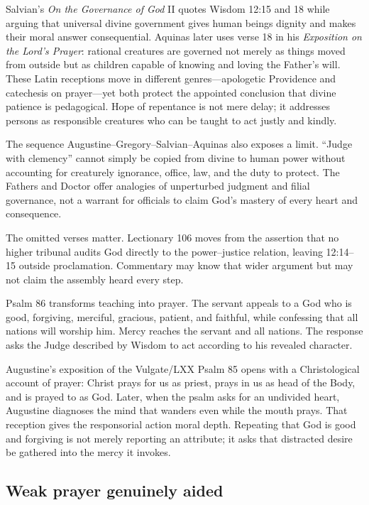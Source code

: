 \begin{deepstudy}
Salvian's \emph{On the Governance of God} II quotes Wisdom 12:15 and 18 while arguing that universal divine government gives human beings dignity and makes their moral answer consequential. Aquinas later uses verse 18 in his \emph{Exposition on the Lord's Prayer}: rational creatures are governed not merely as things moved from outside but as children capable of knowing and loving the Father's will. These Latin receptions move in different genres---apologetic Providence and catechesis on prayer---yet both protect the appointed conclusion that divine patience is pedagogical. Hope of repentance is not mere delay; it addresses persons as responsible creatures who can be taught to act justly and kindly.

The sequence Augustine--Gregory--Salvian--Aquinas also exposes a limit. “Judge with clemency” cannot simply be copied from divine to human power without accounting for creaturely ignorance, office, law, and the duty to protect. The Fathers and Doctor offer analogies of unperturbed judgment and filial governance, not a warrant for officials to claim God's mastery of every heart and consequence.

The omitted verses matter. Lectionary 106 moves from the assertion that no higher tribunal audits God directly to the power--justice relation, leaving 12:14--15 outside proclamation. Commentary may know that wider argument but may not claim the assembly heard every step.

Psalm 86 transforms teaching into prayer. The servant appeals to a God who is good, forgiving, merciful, gracious, patient, and faithful, while confessing that all nations will worship him. Mercy reaches the servant and all nations. The response asks the Judge described by Wisdom to act according to his revealed character.

Augustine's exposition of the Vulgate/LXX Psalm 85 opens with a Christological account of prayer: Christ prays for us as priest, prays in us as head of the Body, and is prayed to as God. Later, when the psalm asks for an undivided heart, Augustine diagnoses the mind that wanders even while the mouth prays. That reception gives the responsorial action moral depth. Repeating that God is good and forgiving is not merely reporting an attribute; it asks that distracted desire be gathered into the mercy it invokes.

\subsection*{Weak prayer genuinely aided\enspace{}}


\end{deepstudy}

